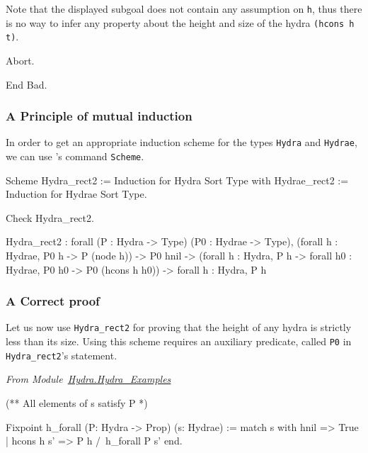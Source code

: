 Note that the displayed subgoal does not contain any assumption on \texttt{h}, thus there is no way to 
infer any property about the height and size of the hydra \texttt{(hcons h t)}.

\begin{Coqbad}
Abort.

End Bad.
\end{Coqbad}

\subsubsection{A Principle of mutual induction}
In order to get an appropriate induction scheme for the types 
\texttt{Hydra} and \texttt{Hydrae}, we can use  \coq{}'s  command \texttt{Scheme}.



\begin{Coqsrc}
Scheme Hydra_rect2 := Induction for Hydra Sort Type
with Hydrae_rect2 := Induction for Hydrae Sort Type.
\end{Coqsrc}  


\begin{Coqsrc}
Check Hydra_rect2.
\end{Coqsrc}


\begin{Coqanswer}
Hydra_rect2
 : forall (P : Hydra -> Type) (P0 : Hydrae -> Type),
   (forall h : Hydrae, P0 h -> P (node h)) ->
    P0 hnil ->
    (forall h : Hydra, P h -> 
             forall h0 : Hydrae, P0 h0 -> P0 (hcons h h0)) ->
    forall h : Hydra, P h
\end{Coqanswer}  




\subsubsection{A Correct proof}

Let us now use \texttt{Hydra\_rect2} for proving that the height of any hydra is strictly less than its size.
Using this scheme requires an auxiliary predicate, called \texttt{P0} in \texttt{Hydra\_rect2}'s statement. 

\vspace{4pt}
\noindent
\emph{From Module~\href{../theories/html/hydras.Hydra.Hydra_Examples.html}{Hydra.Hydra\_Examples}}

\begin{Coqsrc}
(** All elements of s satisfy P *)

Fixpoint h_forall (P: Hydra -> Prop) (s: Hydrae) :=
  match s with
      hnil => True
    | hcons h s' => P h /\ h_forall P s'
  end.
 \end{Coqsrc}

